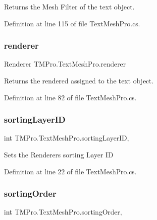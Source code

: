 Returns the Mesh Filter of the text object. 



Definition at line 115 of file Text\+Mesh\+Pro.\+cs.

\mbox{\label{class_t_m_pro_1_1_text_mesh_pro_a883e65b0b1fc2ea28d235a87c333ad71}} 
\subsubsection{\texorpdfstring{renderer}{renderer}}
{\footnotesize\ttfamily Renderer T\+M\+Pro.\+Text\+Mesh\+Pro.\+renderer\hspace{0.3cm}{\ttfamily [get]}}



Returns the rendered assigned to the text object. 



Definition at line 82 of file Text\+Mesh\+Pro.\+cs.

\mbox{\label{class_t_m_pro_1_1_text_mesh_pro_ad241e6c91dab0f2785dc72ce254ce9f4}} 
\subsubsection{\texorpdfstring{sortingLayerID}{sortingLayerID}}
{\footnotesize\ttfamily int T\+M\+Pro.\+Text\+Mesh\+Pro.\+sorting\+Layer\+ID\hspace{0.3cm}{\ttfamily [get]}, {\ttfamily [set]}}



Sets the Renderer\textquotesingle{}s sorting Layer ID 



Definition at line 22 of file Text\+Mesh\+Pro.\+cs.

\mbox{\label{class_t_m_pro_1_1_text_mesh_pro_a0ce42453d522309a1315498a8cc16e4b}} 
\subsubsection{\texorpdfstring{sortingOrder}{sortingOrder}}
{\footnotesize\ttfamily int T\+M\+Pro.\+Text\+Mesh\+Pro.\+sorting\+Order\hspace{0.3cm}{\ttfamily [get]}, {\ttfamily [set]}}



